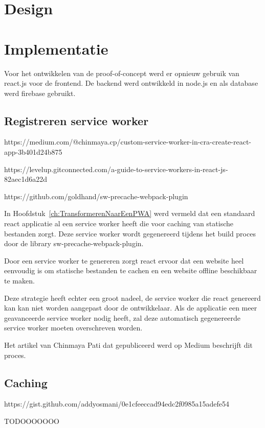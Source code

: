 		
\section{Design} 

\section{Implementatie}
	
	Voor het ontwikkelen van de proof-of-concept werd er opnieuw gebruik van react.js voor de frontend. De backend werd ontwikkeld in node.js en als database werd firebase gebruikt.
	
	\subsection{Registreren service worker}
		https://medium.com/@chinmaya.cp/custom-service-worker-in-cra-create-react-app-3b401d24b875
		
		https://levelup.gitconnected.com/a-guide-to-service-workers-in-react-js-82aec1d6a22d
		
		https://github.com/goldhand/sw-precache-webpack-plugin
		
		In Hoofdstuk~\ref{ch:TransformerenNaarEenPWA} werd vermeld dat een standaard react applicatie al een service worker heeft die voor caching van statische bestanden zorgt. Deze service worker wordt gegenereerd tijdens het build proces door de library sw-precache-webpack-plugin. 
		
		Door een service worker te genereren zorgt react ervoor dat een website heel eenvoudig is om statische bestanden te cachen en een website offline beschikbaar te maken.
		
		Deze strategie heeft echter een groot nadeel, de service worker die react genereerd kan kan niet worden aangepast door de ontwikkelaar. Als de applicatie een meer geavanceerde service worker nodig heeft, zal deze automatisch gegenereerde service worker moeten overschreven worden.
		
		Het artikel van Chinmaya Pati dat gepubliceerd werd op Medium beschrijft dit proces.
		
	\subsection{Caching}
	
	https://gist.github.com/addyosmani/0e1cfeeccad94edc2f0985a15adefe54
	
	TODOOOOOOO
	
